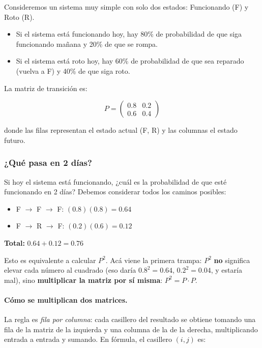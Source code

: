 \documentclass[a4paper,11pt]{article}
\begin{document}
Consideremos un sistema muy simple con solo dos estados: Funcionando (F) y Roto (R).

\begin{itemize}
    \item Si el sistema está funcionando hoy, hay 80\% de probabilidad de que siga funcionando mañana y 20\% de que se rompa.
    \item Si el sistema está roto hoy, hay 60\% de probabilidad de que sea reparado (vuelva a F) y 40\% de que siga roto.
\end{itemize}

La matriz de transición es:

\[P = \begin{pmatrix}
0.8 & 0.2 \\
0.6 & 0.4
\end{pmatrix}\]

donde las filas representan el estado actual (F, R) y las columnas el estado futuro.

\subsubsection{¿Qué pasa en 2 días?}

Si hoy el sistema está funcionando, ¿cuál es la probabilidad de que esté funcionando en 2 días? Debemos considerar todos los caminos posibles:

\begin{itemize}
    \item F $\rightarrow$ F $\rightarrow$ F: $(0.8)(0.8) = 0.64$
    \item F $\rightarrow$ R $\rightarrow$ F: $(0.2)(0.6) = 0.12$
\end{itemize}

\begin{center}
    \textbf{Total:} $0.64 + 0.12 = 0.76$
\end{center}

Esto es equivalente a calcular $P^2$. Acá viene la primera trampa: $P^2$ \textbf{no} significa elevar cada número al cuadrado (eso daría $0.8^2 = 0.64$, $0.2^2 = 0.04$, y estaría mal), sino \textbf{multiplicar la matriz por sí misma}: $P^2 = P \cdot P$.

\paragraph{Cómo se multiplican dos matrices.} La regla es \emph{fila por columna}: cada casillero del resultado se obtiene tomando una fila de la matriz de la izquierda y una columna de la de la derecha, multiplicando entrada a entrada y sumando. En fórmula, el casillero $(i,j)$ es:
\end{document}
